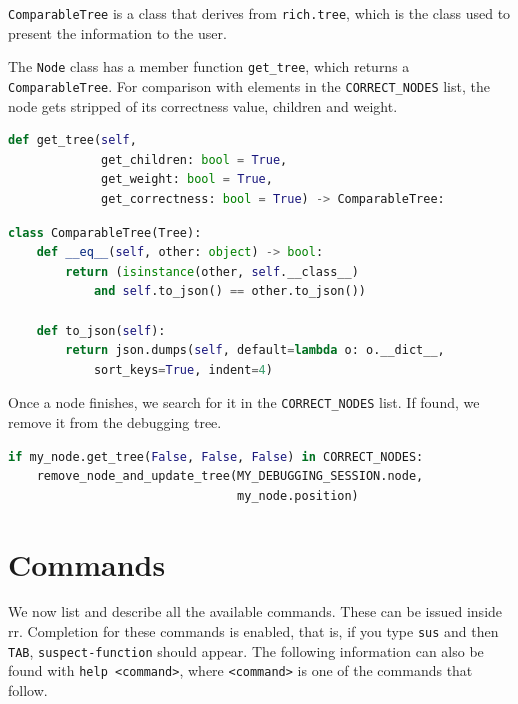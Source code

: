 \verb|ComparableTree| is a class that derives from \verb|rich.tree|, which is the class used to present the information to the user.

The \verb|Node| class has a member function \verb|get_tree|, which returns a \verb|ComparableTree|.
For comparison with elements in the \verb|CORRECT_NODES| list, the node gets stripped of its correctness value, children and weight.
\begin{lstlisting}[language=Python, caption={Node class method signature for getting a comparable tree}]
def get_tree(self,
             get_children: bool = True,
             get_weight: bool = True,
             get_correctness: bool = True) -> ComparableTree:
\end{lstlisting}
\begin{lstlisting}[language=Python, caption=Comparable tree class]
class ComparableTree(Tree):
    def __eq__(self, other: object) -> bool:
        return (isinstance(other, self.__class__)
            and self.to_json() == other.to_json())

    def to_json(self):
        return json.dumps(self, default=lambda o: o.__dict__,
            sort_keys=True, indent=4)
\end{lstlisting}

Once a node finishes, we search for it in the \verb|CORRECT_NODES| list. If found, we remove it from the debugging tree.
\begin{lstlisting}[language=Python, caption=Removing finished node from tree if it is correct]
if my_node.get_tree(False, False, False) in CORRECT_NODES:
    remove_node_and_update_tree(MY_DEBUGGING_SESSION.node,
                                my_node.position)
\end{lstlisting}

\section{Commands}
We now list and describe all the available commands. These can be issued inside rr. Completion for these commands is enabled, that is, if you type \verb|sus| and then \verb|TAB|, \verb|suspect-function| should appear.
The following information can also be found with \verb|help <command>|, where \verb|<command>| is one of the commands that follow.

